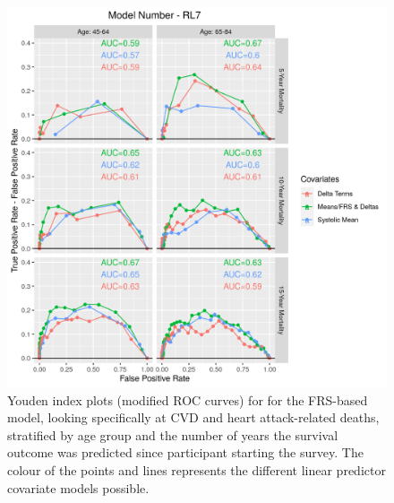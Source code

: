 \documentclass[
]{article}
\begin{document}
\begin{figure}
\centering
\includegraphics{./Rmarkdown_Plots/ROC_CAx-Covariates_EventType_RL7.png}
\caption{Youden index plots (modified ROC curves) for for the FRS-based model, looking specifically at CVD and heart attack-related deaths, stratified by age group and the number of years the survival outcome was predicted since participant starting the survey. The colour of the points and lines represents the different linear predictor covariate models possible.}\label{fig:ROC_RL7}
\end{figure}
\end{document}
